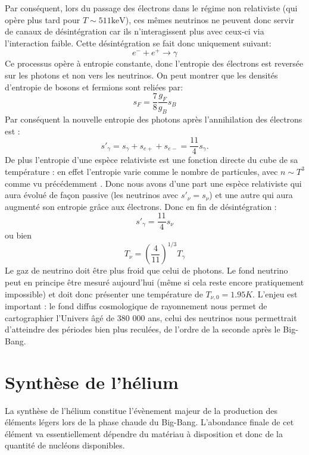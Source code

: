 Par conséquent, lors du passage des électrons dans le régime non relativiste (qui opère plus tard pour $T\sim 511 \mathrm{keV}$), ces mêmes neutrinos ne peuvent donc servir de canaux de désintégration car ils n'interagissent plus avec ceux-ci via l'interaction faible. Cette désintégration se fait donc uniquement suivant:
\begin{equation}
e^-+e^+\rightarrow \gamma
\end{equation}
Ce processus opère à entropie constante, donc l'entropie des électrons est reversée sur les photons et non vers les neutrinos. On peut montrer que les densités d'entropie de bosons et fermions sont reliées par:
\begin{equation}
s_F=\frac{7}{8}\frac{g_F}{g_B} s_B
\end{equation}
Par conséquent la nouvelle entropie des photons après l'annihilation des électrons est :
\begin{equation}
s'_\gamma=s_\gamma+s_{e+}+s_{e-}=\frac{11}{4}s_\gamma.
\end{equation}
De plus l'entropie d'une espèce relativiste est une fonction directe du cube de sa température : en effet l'entropie varie comme le nombre de particules, avec $n\sim T^3$ comme vu précédemment . Donc nous avons d'une part une espèce relativiste qui aura évolué de façon passive  (les neutrinos avec $s'_\nu=s_\nu$) et une autre qui aura augmenté son entropie grâce aux électrons. Donc en fin de désintégration :
\begin{equation}
s'_\gamma=\frac{11}{4} s_\nu
\end{equation}
ou bien
\begin{equation}
T_\nu=\left(\frac{4}{11}\right)^{1/3} T_\gamma
\end{equation}
Le gaz de neutrino doit être plus froid que celui de photons. Le fond neutrino peut en principe être mesuré aujourd'hui (même si cela reste encore pratiquement impossible) et doit donc présenter une température de  $T_{\nu,0}=1.95 K$. L'enjeu est important : le fond diffus cosmologique de rayonnement nous permet de cartographier l'Univers âgé de 380 000 ans, celui des neutrinos nous permettrait d'atteindre des périodes bien plus reculées, de l'ordre de la seconde après le Big-Bang.

\section{Synthèse de l'hélium}
La synthèse de l'hélium constitue l'évènement majeur de la production des éléments légers lors de la phase chaude du Big-Bang. L'abondance finale de cet élément va essentiellement dépendre du matériau à disposition et donc de la quantité de nucléons disponibles.

